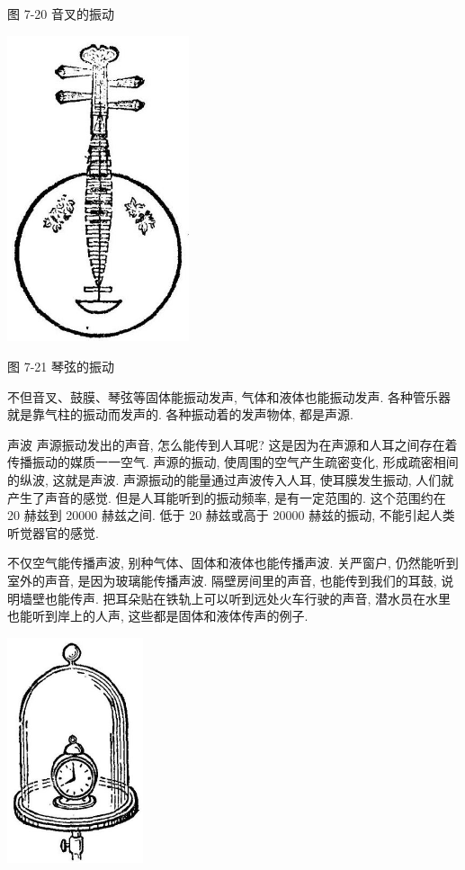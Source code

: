 \documentclass[10pt]{article}
\begin{document}
图 7-20 音叉的振动

\begin{center}
\includegraphics[max width=0.4\textwidth]{images/01912d55-147c-70aa-b0e0-1782a122f948_217_401399.jpg}
\end{center}

图 7-21 琴弦的振动

不但音叉、鼓膜、琴弦等固体能振动发声, 气体和液体也能振动发声. 各种管乐器就是靠气柱的振动而发声的. 各种振动着的发声物体, 都是声源.

声波 声源振动发出的声音, 怎么能传到人耳呢? 这是因为在声源和人耳之间存在着传播振动的媒质一一空气. 声源的振动, 使周围的空气产生疏密变化, 形成疏密相间的纵波, 这就是声波. 声源振动的能量通过声波传入人耳, 使耳膜发生振动, 人们就产生了声音的感觉. 但是人耳能听到的振动频率, 是有一定范围的. 这个范围约在 20 赫兹到 20000 赫兹之间. 低于 20 赫兹或高于 20000 赫兹的振动, 不能引起人类听觉器官的感觉.

不仅空气能传播声波, 别种气体、固体和液体也能传播声波. 关严窗户, 仍然能听到室外的声音, 是因为玻璃能传播声波. 隔壁房间里的声音, 也能传到我们的耳鼓, 说明墙壁也能传声. 把耳朵贴在铁轨上可以听到远处火车行驶的声音, 潜水员在水里也能听到岸上的人声, 这些都是固体和液体传声的例子.

\begin{center}
\includegraphics[max width=0.3\textwidth]{images/01912d55-147c-70aa-b0e0-1782a122f948_218_605382.jpg}
\end{center}
\end{document}
